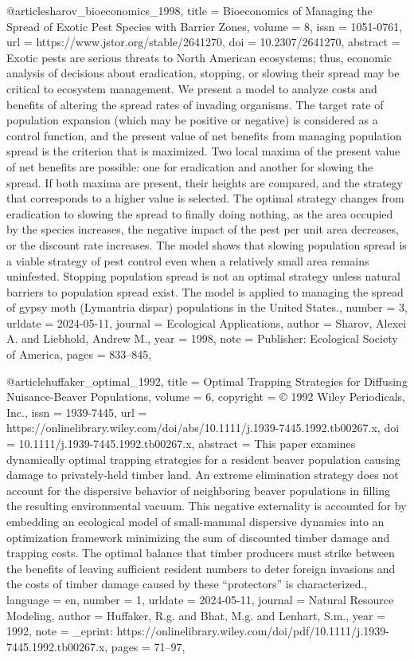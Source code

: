 {{{{@article{sharov_bioeconomics_1998,
	title = {Bioeconomics of {Managing} the {Spread} of {Exotic} {Pest} {Species} with {Barrier} {Zones}},
	volume = {8},
	issn = {1051-0761},
	url = {https://www.jstor.org/stable/2641270},
	doi = {10.2307/2641270},
	abstract = {Exotic pests are serious threats to North American ecosystems; thus, economic analysis of decisions about eradication, stopping, or slowing their spread may be critical to ecosystem management. We present a model to analyze costs and benefits of altering the spread rates of invading organisms. The target rate of population expansion (which may be positive or negative) is considered as a control function, and the present value of net benefits from managing population spread is the criterion that is maximized. Two local maxima of the present value of net benefits are possible: one for eradication and another for slowing the spread. If both maxima are present, their heights are compared, and the strategy that corresponds to a higher value is selected. The optimal strategy changes from eradication to slowing the spread to finally doing nothing, as the area occupied by the species increases, the negative impact of the pest per unit area decreases, or the discount rate increases. The model shows that slowing population spread is a viable strategy of pest control even when a relatively small area remains uninfested. Stopping population spread is not an optimal strategy unless natural barriers to population spread exist. The model is applied to managing the spread of gypsy moth (Lymantria dispar) populations in the United States.},
	number = {3},
	urldate = {2024-05-11},
	journal = {Ecological Applications},
	author = {Sharov, Alexei A. and Liebhold, Andrew M.},
	year = {1998},
	note = {Publisher: Ecological Society of America},
	pages = {833--845},
}

@article{huffaker_optimal_1992,
	title = {Optimal {Trapping} {Strategies} for {Diffusing} {Nuisance}-{Beaver} {Populations}},
	volume = {6},
	copyright = {© 1992 Wiley Periodicals, Inc.},
	issn = {1939-7445},
	url = {https://onlinelibrary.wiley.com/doi/abs/10.1111/j.1939-7445.1992.tb00267.x},
	doi = {10.1111/j.1939-7445.1992.tb00267.x},
	abstract = {This paper examines dynamically optimal trapping strategies for a resident beaver population causing damage to privately-held timber land. An extreme elimination strategy does not account for the dispersive behavior of neighboring beaver populations in filling the resulting environmental vacuum. This negative externality is accounted for by embedding an ecological model of small-mammal dispersive dynamics into an optimization framework minimizing the sum of discounted timber damage and trapping costs. The optimal balance that timber producers must strike between the benefits of leaving sufficient resident numbers to deter foreign invasions and the costs of timber damage caused by these “protectors” is characterized.},
	language = {en},
	number = {1},
	urldate = {2024-05-11},
	journal = {Natural Resource Modeling},
	author = {Huffaker, R.g. and Bhat, M.g. and Lenhart, S.m.},
	year = {1992},
	note = {\_eprint: https://onlinelibrary.wiley.com/doi/pdf/10.1111/j.1939-7445.1992.tb00267.x},
	pages = {71--97},
}

}}}}

